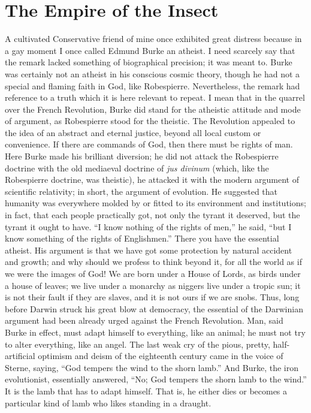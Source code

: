 \documentclass{book}
\begin{document}
\chapter{The Empire of the Insect}
\label{chapter-47}
A cultivated Conservative friend of mine once exhibited great distress because in a gay moment I once called Edmund Burke an atheist. I need scarcely say that the remark lacked something of biographical precision; it was meant to. Burke was certainly not an atheist in his conscious cosmic theory, though he had not a special and flaming faith in God, like Robespierre. Nevertheless, the remark had reference to a truth which it is here relevant to repeat. I mean that in the quarrel over the French Revolution, Burke did stand for the atheistic attitude and mode of argument, as Robespierre stood for the theistic. The Revolution appealed to the idea of an abstract and eternal justice, beyond all local custom or convenience. If there are commands of God, then there must be rights of man. Here Burke made his brilliant diversion; he did not attack the Robespierre doctrine with the old mediaeval doctrine of \emph{jus divinum} (which, like the Robespierre doctrine, was theistic), he attacked it with the modern argument of scientific relativity; in short, the argument of evolution. He suggested that humanity was everywhere molded by or fitted to its environment and institutions; in fact, that each people practically got, not only the tyrant it deserved, but the tyrant it ought to have. “I know nothing of the rights of men,” he said, “but I know something of the rights of Englishmen.” There you have the essential atheist. His argument is that we have got some protection by natural accident and growth; and why should we profess to think beyond it, for all the world as if we were the images of God! We are born under a House of Lords, as birds under a house of leaves; we live under a monarchy as niggers live under a tropic sun; it is not their fault if they are slaves, and it is not ours if we are snobs. Thus, long before Darwin struck his great blow at democracy, the essential of the Darwinian argument had been already urged against the French Revolution. Man, said Burke in effect, must adapt himself to everything, like an animal; he must not try to alter everything, like an angel. The last weak cry of the pious, pretty, half-artificial optimism and deism of the eighteenth century came in the voice of Sterne, saying, “God tempers the wind to the shorn lamb.” And Burke, the iron evolutionist, essentially answered, “No; God tempers the shorn lamb to the wind.” It is the lamb that has to adapt himself. That is, he either dies or becomes a particular kind of lamb who likes standing in a draught.
\end{document}
